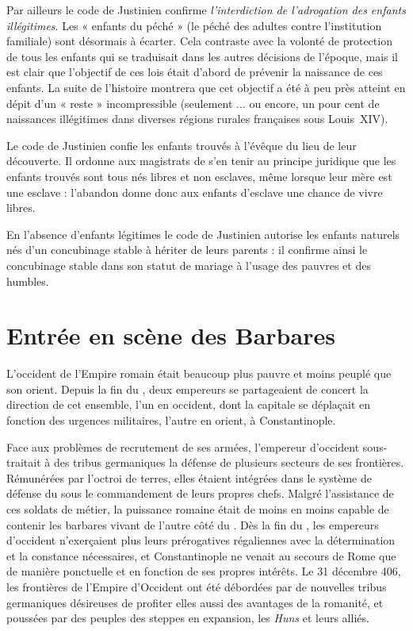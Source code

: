 \begin{description}
 Par ailleurs le code de Justinien confirme \emph{l'interdiction de l'adrogation des enfants illégitimes}. Les « enfants du péché » (le péché des adultes contre l'institution familiale) sont désormais à écarter. Cela contraste avec la volonté de protection de tous les enfants qui se traduisait dans les autres décisions de l'époque, mais il est clair que l'objectif de ces lois était d'abord de prévenir la naissance de ces enfants. La suite de l'histoire montrera que cet objectif a été à peu près atteint en dépit d'un « reste » incompressible (seulement ... ou encore, un pour cent de naissances illégitimes dans diverses régions rurales françaises sous Louis~XIV). 

 Le code de Justinien confie les enfants trouvés à l'évêque du lieu de leur découverte. Il ordonne aux magistrats de s'en tenir au principe juridique que les enfants trouvés sont tous nés libres et non esclaves, même lorsque leur mère est une esclave : l'abandon donne donc aux enfants d'esclave une chance de vivre libres. 

 En l'absence d'enfants légitimes le code de Justinien autorise les enfants naturels nés d'un concubinage stable à hériter de leurs parents : il confirme ainsi le concubinage stable dans son statut de mariage à l'usage des pauvres et des humbles. 
\end{description}


\section{Entrée en scène des Barbares}


 L'occident de l'Empire romain était beaucoup plus pauvre et moins peuplé que son orient. Depuis la fin du , deux empereurs se partageaient de concert la direction de cet ensemble, l'un en occident, dont la capitale se déplaçait en fonction des urgences militaires, l'autre en orient, à Constantinople. 

 Face aux problèmes de recrutement de ses armées, l'empereur d'occident sous-traitait à des tribus germaniques la défense de plusieurs secteurs de ses frontières. Rémunérées par l'octroi de terres, elles étaient intégrées dans le système de défense du  sous le commandement de leurs propres chefs. Malgré l'assistance de ces soldats de métier, la puissance romaine était de moins en moins capable de contenir les barbares vivant de l'autre côté du . Dès la fin du , les empereurs d'occident n'exerçaient plus leurs prérogatives régaliennes avec la détermination et la constance nécessaires, et Constantinople ne venait au secours de Rome que de manière ponctuelle et en fonction de ses propres intérêts. Le 31 décembre 406, les frontières de l'Empire d'Occident ont été débordées par de nouvelles tribus germaniques désireuses de profiter elles aussi des avantages de la romanité, et poussées par des peuples des steppes en expansion, les \emph{Huns} et leurs alliés.

